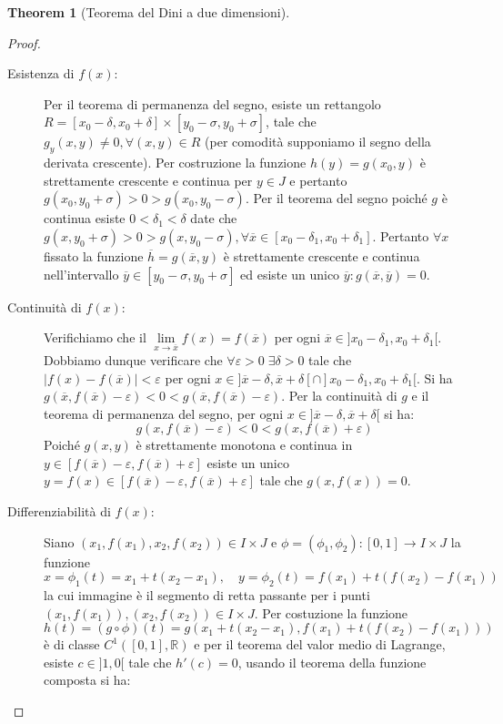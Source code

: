 \documentclass[leqno]{article}
\theoremstyle{definition}
\numberwithin{equation}{section}
\newtheorem{theorem}{Theorem}[section]
\theoremstyle{remark}
\begin{document}
\begin{theorem}[Teorema del Dini a due dimensioni]
\begin{proof}
\begin{description}
				\item [Esistenza di $f(x)$:] Per il teorema di permanenza del segno, esiste un rettangolo $R=[x_0-\delta,x_0+\delta]\times [y_0-\sigma, y_0+\sigma]$, tale che $g_y(x,y)\neq0, \forall(x,y)\in R$ (per comodità supponiamo il segno della derivata crescente). Per costruzione la funzione $h(y)=g(x_0,y)$ è strettamente crescente e continua per $y \in J$ e pertanto $g(x_0,y_0+\sigma)>0>g(x_0,y_0-\sigma)$. Per il teorema del segno poiché $g$ è continua esiste $0<\delta_1<\delta$ date che $g(x,y_0+\sigma)>0>g(x,y_0-\sigma), \forall \overline{x} \in [x_0-\delta_1,x_0+\delta_1]$. Pertanto $\forall x$ fissato la funzione $\overline{h}=g(\overline{x},y)$ è strettamente crescente e continua nell'intervallo $\overline{y}\in [y_0-\sigma, y_0+\sigma]$ ed esiste un unico $\overline{y}: g(\overline{x},\overline{y})=0$.
				\item[Continuità di $f(x)$:] Verifichiamo che il $\lim\limits_{x\to \overline{x}}f(x)=f(\overline{x})$ per ogni $\overline{x}\in]x_0-\delta_1,x_0+\delta_1[$. Dobbiamo dunque verificare che $\forall \varepsilon >0 \; \exists \delta > 0$ tale che $|f(x)-f(\overline{x})|<\varepsilon$ per ogni $x\in ]\overline{x}-\delta,\overline{x}+\delta[\cap]x_0-\delta_1,x_0+\delta_1[$. Si ha $g(\overline{x}, f(\overline{x})-\varepsilon)<0<g(\overline{x}, f(\overline{x})-\varepsilon)$. Per la continuità di $g$ e il teorema di permanenza del segno, per ogni $x\in ]\overline{x}-\delta,\overline{x}+\delta[$ si ha:
				\begin{equation}
					g(x,f(\overline{x})-\varepsilon)< 0 < g(x,f(\overline{x})+\varepsilon)
				\end{equation}
				Poiché $g(x,y)$ è strettamente monotona e continua in $y\in [f(\overline{x})-\varepsilon, f(\overline{x})+\varepsilon]$ esiste un unico $y=f(x)\in[f(\overline{x})-\varepsilon, f(\overline{x})+\varepsilon]$ tale che $g(x,f(x))=0$.
				\item[Differenziabilità di $f(x)$:] Siano $(x_1,f(x_1),x_2,f(x_2))\in I \times J$ e $\phi=(\phi_1,\phi_2):[0,1]\rightarrow I\times J$ la funzione 
				\[x=\phi_1(t)=x_1+ t(x_2-x_1), \quad y=\phi_2(t)=f(x_1)+t(f(x_2)-f(x_1)) \]
				la cui immagine è il segmento di retta passante per i punti $(x_1,f(x_1)),(x_2,f(x_2))\in I\times J$. Per costuzione la funzione 
				\begin{equation}
					h(t)=(g\circ \phi)(t)=g(x_1+ t(x_2-x_1),f(x_1)+t(f(x_2)-f(x_1)))
				\end{equation}
				è di classe $C^1([0,1],\mathbb{R})$ e per il teorema del valor medio di Lagrange, esiste $c\in]1,0[$ tale che $h'(c)=0$, usando il teorema della funzione composta si ha:

\end{description}
\end{proof}
\end{theorem}
\end{document}
